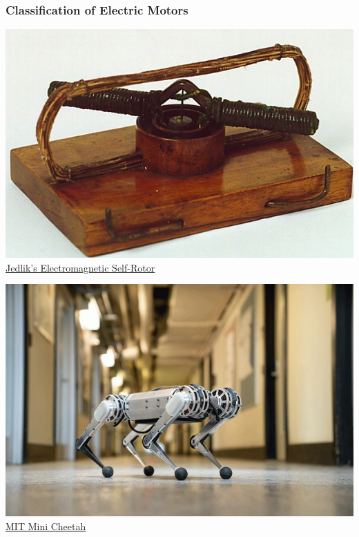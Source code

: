 \documentclass[fleqn]{beamer} %
\newcommand{\sectiontitleI}{Classification of Electric Motors}
\begin{document}
		\begin{frame}[label=sectionI] \small
			\frametitle{\sectiontitleI}	
	
			\begin{multicols}{2}
				\includegraphics[scale=0.25]{images/Jedlik_motor.jpeg}	
				\href{https://en.wikipedia.org/wiki/Electric_motor}{Jedlik's Electromagnetic Self-Rotor}

				\includegraphics[scale=0.15]{images/MIT-mini-cheetah-01_0.jpg}
				\href{https://news.mit.edu/2019/mit-mini-cheetah-first-four-legged-robot-to-backflip-0304}{MIT Mini Cheetah}
			\end{multicols}

		\end{frame}


	
\end{document}
